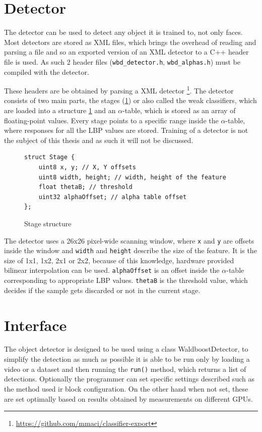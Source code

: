 \section{Detector}\label{sec:detector}

The detector can be used to detect any object it is trained to, not only faces. Most detectors are stored as XML files, which brings the overhead of reading and parsing a file and so an exported version of an XML detector to a C++ header file is used. As such 2 header files (\verb|wbd_detector.h|, \verb|wbd_alphas.h|) must be compiled with the detector.

These headers are be obtained by parsing a XML detector \footnote{\url{https://github.com/mmaci/classifier-export}}. The detector consists of two main parts, the stages (\ref{fig:stage}) or also called the weak classifiers, which are loaded into a structure \ref{fig:stage} and an $\alpha$-table, which is stored as an array of floating-point values. Every stage points to a specific range inside the $\alpha$-table, where responses for all the LBP values are stored. Training of a detector is not the subject of this thesis and as such it will not be discussed.

\begin{figure}[h!]
\begin{verbatim}
struct Stage {
    uint8 x, y; // X, Y offsets
    uint8 width, height; // width, height of the feature
    float thetaB; // threshold
    uint32 alphaOffset; // alpha table offset
};
\end{verbatim}
\caption{Stage structure}
\label{fig:stage}
\end{figure}

The detector uses a 26x26 pixel-wide scanning window, where \verb|x| and \verb|y| are offsets inside the window and \verb|width| and \verb|height| describe the size of the feature. It is the size of 1x1, 1x2, 2x1 or 2x2, because of this knowledge, hardware provided bilinear interpolation can be used. \verb|alphaOffset| is an offset inside the $\alpha$-table corresponding to appropriate LBP values. \verb|thetaB| is the threshold value, which decides if the sample gets discarded or not in the current stage.

\section{Interface}

The object detector is designed to be used using a class WaldboostDetector, to simplify the detection as much as possible it is able to be run only by loading a video or a dataset and then running the \verb|run()| method, which returns a list of detections. Optionally the programmer can set specific settings described such as the method used ir block configuration. On the other hand when not set, these are set optimally based on results obtained by measurements on different GPUs.

